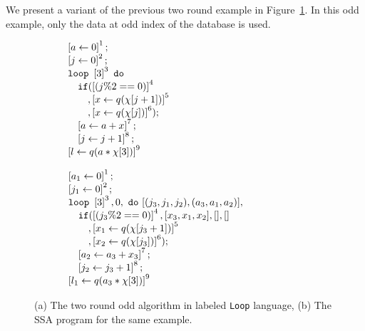 \begin{example}
We present a variant of the previous two round example in Figure~\ref{fig:tworound_odd}. In this odd example, only the data at odd index of the database is used.
%
{\small
\begin{figure}
\begin{subfigure}{.4\textwidth}
\begin{centering}
$\begin{array}{l}
   \left[  \mathrel{ a \leftarrow 0 }   \right]^{1} ; \\
    \left[ \mathrel{ j \leftarrow 0 }  \right]^{2} ; \\
    \mathtt{loop} ~ \left[ 3 \right]^{3} ~ \mathtt{do} ~ \\
   \quad 
     \mathtt{if} ( \left[ ( j \% 2 == 0) \right]^{4}\\
     \quad \quad ,\left[  \mathrel{ x \leftarrow  q(\chi[j+1]) }  \right]^{5}  \\
     \quad \quad ,\left[ \mathrel{ x \leftarrow  q(\chi[j])  } \right]^{6} ) ;\\
     \quad \left[ \mathrel{ a \leftarrow  a+x }  \right]^{7}  ;\\
     \quad \left[  \mathrel{ j \leftarrow j+1 }  \right]^{8}      ;\\
 \left[ l \leftarrow q(a*\chi[3])  \right]^{9}\\
\end{array} $
\caption{}
\end{centering}
\end{subfigure}
\begin{subfigure}{0.5\textwidth}
\begin{centering}
$
\begin{array}{l}
    \left[  \mathrel{ a_1 \leftarrow 0 }   \right]^{1} ; \\
    \left[ \mathrel{ j_1 \leftarrow 0 }  \right]^{2} ; \\
    \mathtt{loop} ~ \left[ 3 \right]^{3} , 0,  ~ \mathtt{do} ~ [(j_3, j_1,j_2), (a_3, a_1,a_2)], \\
  \quad 
     \mathtt{if} ( \left[ ( j_3 \% 2 == 0) \right]^{4}, [x_3,x_1,x_2], [],[]\\
     \quad \quad ,\left[  \mathrel{ x_1 \leftarrow  q(\chi[j_3+1]) }  \right]^{5}  \\
     \quad \quad ,\left[ \mathrel{ x_2 \leftarrow  q(\chi[j_3])  } \right]^{6} ) ;\\
     \quad \left[ \mathrel{ a_2 \leftarrow  a_3+x_3 }  \right]^{7}  ;\\
     \quad \left[  \mathrel{ j_2 \leftarrow j_3+1 }  \right]^{8}      ;\\
 \left[ l_1 \leftarrow q(a_3*\chi[3])  \right]^{9}\\
\end{array}$
\caption{}
\end{centering}
\end{subfigure}
    \vspace{-0.2cm}
    \caption{(a) The two round odd algorithm in labeled {\tt Loop} language, (b) The SSA program for the same example. }
    \label{fig:tworound_odd}
    \vspace{-0.5cm}
\end{figure}
}
\end{example}
